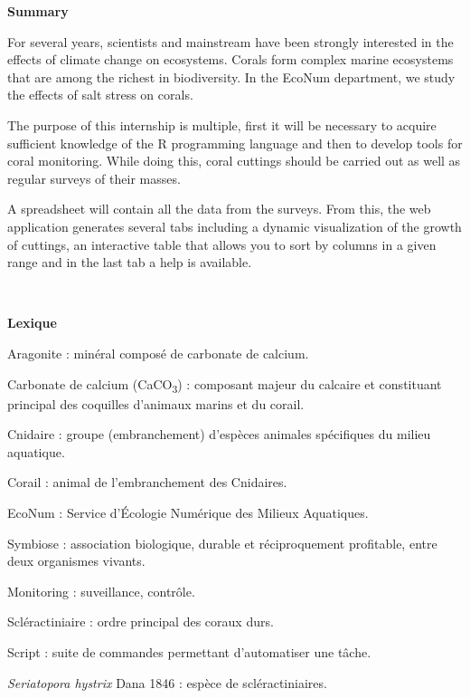 \documentclass[]{report}
\begin{document}
\vspace{2 cm}

\Huge 
{\bf Summary} \vspace{1 cm}

\normalsize
For several years, scientists and mainstream have been strongly
interested in the effects of climate change on ecosystems. Corals form
complex marine ecosystems that are among the richest in biodiversity. In
the EcoNum department, we study the effects of salt stress on corals.

The purpose of this internship is multiple, first it will be necessary
to acquire sufficient knowledge of the R programming language and then
to develop tools for coral monitoring. While doing this, coral cuttings
should be carried out as well as regular surveys of their masses.

A spreadsheet will contain all the data from the surveys. From this, the
web application generates several tabs including a dynamic visualization
of the growth of cuttings, an interactive table that allows you to sort
by columns in a given range and in the last tab a help is available.

\null
\newpage

\tableofcontents

\null
\newpage

\textcolor{white}{.}

\Huge 
{\bf Lexique} \vspace{1 cm}

\normalsize
Aragonite : minéral composé de carbonate de calcium.

Carbonate de calcium (CaCO\textsubscript{3}) : composant majeur du
calcaire et constituant principal des coquilles d'animaux marins et du
corail.

Cnidaire : groupe (embranchement) d'espèces animales spécifiques du
milieu aquatique.

Corail : animal de l'embranchement des Cnidaires.

EcoNum : Service d'Écologie Numérique des Milieux Aquatiques.

Symbiose : association biologique, durable et réciproquement profitable,
entre deux organismes vivants.

Monitoring : suveillance, contrôle.

Scléractiniaire : ordre principal des coraux durs.

Script : suite de commandes permettant d'automatiser une tâche.

\emph{Seriatopora hystrix} Dana 1846 : espèce de scléractiniaires.
\end{document}
